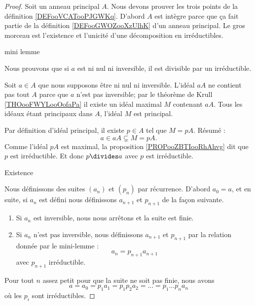 \begin{proof}
	Soit un anneau principal \( A\). Nous devons prouver les trois points de la définition \ref{DEFooVCATooPJGWKq}. D'abord \( A\) est intègre parce que ça fait partie de la définition \ref{DEFooGWOZooXzUlhK} d'un anneau principal. Le gros morceau est l'existence et l'unicité d'une décomposition en irréductibles.

	\begin{proofpart}
		mini lemme
	\end{proofpart}
	Nous prouvons que si \( a\) est ni nul ni inversible, il est divisible par un irréductible.

	Soit \( a\in A\) que nous supposons être ni nul ni inversible. L'idéal \( aA\) ne contient pas tout \( A\) parce que \( a\) n'est pas inversible; par le théorème de Krull \ref{THOooFWYLooOofaPa} il existe un idéal maximal \( M\) contenant \( aA\). Tous les idéaux étant principaux dans \( A\), l'idéal \( M\) est principal.

	Par définition d'idéal principal, il existe \( p\in A\) tel que \( M=pA\). Résumé :
	\begin{equation}
		a\in aA\subsetneq M=pA.
	\end{equation}
	Comme l'idéal \( pA\) est maximal, la proposition \ref{PROPooZBTIooRhAhvg} dit que \( p\) est irréductible. Et donc \( p\divides a\) avec \( p \) est irréductible.

	\begin{proofpart}
		Existence
	\end{proofpart}

	Nous définissons des suites \( (a_n)\) et \( (p_n)\) par récurrence. D'abord \( a_0=a\), et en suite, si \( a_n\) est défini nous définissons \( a_{n+1}\) et \( p_{n+1}\) de la façon suivante.
	\begin{enumerate}
		\item
		      Si \( a_n\) est inversible, nous nous arrêtons et la suite est finie.
		\item
		      Si \( a_n\) n'est pas inversible, nous définissons \( a_{n+1}\) et \( p_{n+1}\) par la relation donnée par le mini-lemme :
		      \begin{equation}
			      a_n=p_{n+1}a_{n+1}
		      \end{equation}
		      avec \( p_{n+1}\) irréductible.
	\end{enumerate}

	Pour tout \( n\) assez petit pour que la suite ne soit pas finie, nous avons
	\begin{equation}
		a=a_0=p_1a_1=p_1p_2a_2=\ldots =p_1\ldots p_na_n
	\end{equation}
	où les \( p_i\) sont irréductibles.


\end{proof}
